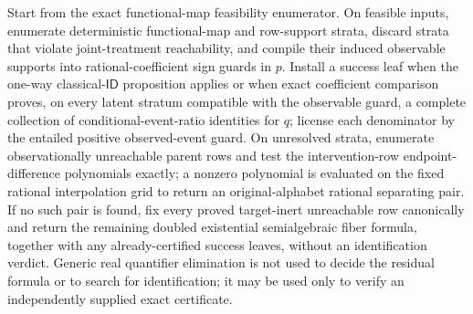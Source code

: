 Start from the exact functional-map feasibility enumerator. On feasible inputs, enumerate deterministic functional-map and row-support strata, discard strata that violate joint-treatment reachability, and compile their induced observable supports into rational-coefficient sign guards in \(p\). Install a success leaf when the one-way classical-\(\mathsf{ID}\) proposition applies or when exact coefficient comparison proves, on every latent stratum compatible with the observable guard, a complete collection of conditional-event-ratio identities for \(q\); license each denominator by the entailed positive observed-event guard. On unresolved strata, enumerate observationally unreachable parent rows and test the intervention-row endpoint-difference polynomials exactly; a nonzero polynomial is evaluated on the fixed rational interpolation grid to return an original-alphabet rational separating pair. If no such pair is found, fix every proved target-inert unreachable row canonically and return the remaining doubled existential semialgebraic fiber formula, together with any already-certified success leaves, without an identification verdict. Generic real quantifier elimination is not used to decide the residual formula or to search for identification; it may be used only to verify an independently supplied exact certificate.